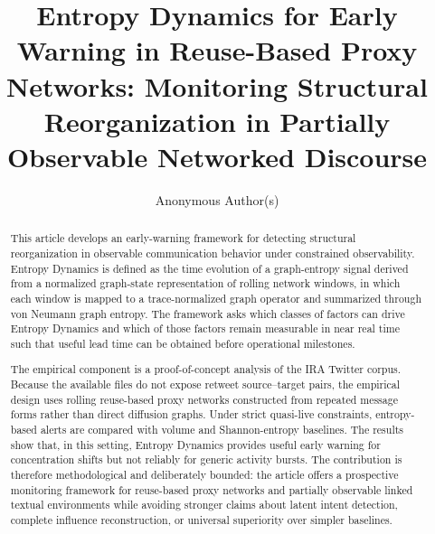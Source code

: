 \documentclass[sigconf]{acmart}
\begin{document}
\title[Entropy Dynamics for Early Warning]{Entropy Dynamics for Early Warning in Reuse-Based Proxy Networks:
Monitoring Structural Reorganization in Partially Observable Networked Discourse}

\author{Anonymous Author(s)}
\renewcommand{\shortauthors}{Anonymous Author(s)}

\begin{abstract}
This article develops an early-warning framework for detecting structural reorganization in observable communication behavior under constrained observability. Entropy Dynamics is defined as the time evolution of a graph-entropy signal derived from a normalized graph-state representation of rolling network windows, in which each window is mapped to a trace-normalized graph operator and summarized through von Neumann graph entropy. The framework asks which classes of factors can drive Entropy Dynamics and which of those factors remain measurable in near real time such that useful lead time can be obtained before operational milestones.

The empirical component is a proof-of-concept analysis of the IRA Twitter corpus. Because the available files do not expose retweet source--target pairs, the empirical design uses rolling reuse-based proxy networks constructed from repeated message forms rather than direct diffusion graphs. Under strict quasi-live constraints, entropy-based alerts are compared with volume and Shannon-entropy baselines. The results show that, in this setting, Entropy Dynamics provides useful early warning for concentration shifts but not reliably for generic activity bursts. The contribution is therefore methodological and deliberately bounded: the article offers a prospective monitoring framework for reuse-based proxy networks and partially observable linked textual environments while avoiding stronger claims about latent intent detection, complete influence reconstruction, or universal superiority over simpler baselines.
\end{abstract}


\maketitle
\end{document}
